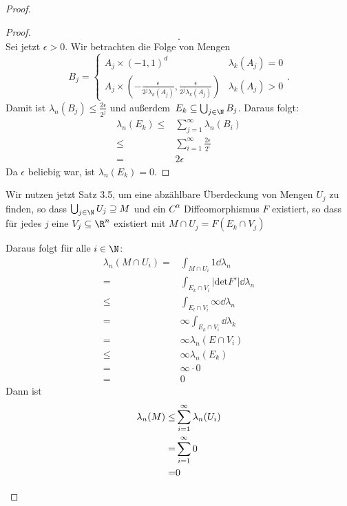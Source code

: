 \begin{proof}
\begin{parts}
\begin{tcolorbox}
\begin{proof}
\[			.\] 
			Sei jetzt $\epsilon>0$. Wir betrachten die Folge von Mengen
			\[
			B_j=\begin{cases}
				A_j\times (-1,1)^d & \lambda_k(A_j)=0\\
				A_j\times \left( -\frac{\epsilon}{2^j\lambda_k(A_j)}, \frac{\epsilon}{2^j\lambda_k(A_j)} \right) & \lambda_k(A_j)>0 
			\end{cases}
			.\] 
			Damit ist $\lambda_n(B_j)\le \frac{2\epsilon}{2^j}$ und außerdem $E_k\subseteq \bigcup_{j\in \N} B_j$. Daraus folgt:
			\begin{align*}
				\lambda_n(E_k)\le& \sum_{j=1}^\infty \lambda_n(B_i)\\
				\le& \sum_{i=1}^\infty \frac{2\epsilon}{2^i}\\
				=&2\epsilon
			\end{align*}
			Da $\epsilon$ beliebig war, ist $\lambda_n(E_k)=0$.
		\end{proof}
	\end{tcolorbox}
	Wir nutzen jetzt Satz 3.5, um eine abzählbare Überdeckung von Mengen $U_j$ zu finden, so dass $\bigcup_{j\in \N} U_j\supseteq M$ und ein $C^\alpha$ Diffeomorphismus $F$ existiert, so dass f\"{u}r jedes $j$ eine $V_j\subseteq \R^n$ existiert mit $M\cap U_j=F(E_k\cap V_j)$ 

	Daraus folgt f\"{u}r alle $i\in \N$:
	\begin{align*}
		\lambda_n(M\cap U_i)=&\int_{M\cap U_i}1\dd{\lambda_n}\\
		=&\int_{E_k\cap V_i}|\text{det}F'|\dd{\lambda_n}\\
		\le&\int_{E_l\cap V_i}\infty\dd{\lambda_n}\\
		=&\infty \int_{E_k\cap V_i}\dd{\lambda_k}\\
		=&\infty\lambda_n(E\cap V_i)\\
		\le&\infty\lambda_n(E_k)\\
		=&\infty\cdot 0\\
		=&0
	\end{align*}
	Dann ist
\begin{align*}
	\lambda_n(M)\le&\sum_{i=1}^\infty \lambda_n(U_i)\\
	=&\sum_{i=1}^\infty 0\\
	=&0\qedhere
\end{align*}
	\end{parts}
\end{proof}
